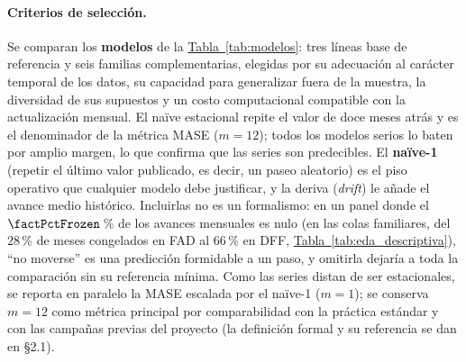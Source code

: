 \documentclass[12pt,letterpaper]{report}
\begin{document}
\paragraph{Criterios de selección.} Se comparan los \textbf{\factNModels{} modelos} de la
\hyperref[tab:modelos]{Tabla~\ref*{tab:modelos}}: tres líneas base de referencia y seis familias complementarias,
elegidas por su adecuación al carácter temporal de los datos, su capacidad para generalizar
fuera de la muestra, la diversidad de sus supuestos y un costo computacional compatible con la
actualización mensual. El naïve estacional repite el valor de doce meses atrás y es el
denominador de la métrica MASE ($m=12$); todos los modelos serios lo baten por amplio margen,
lo que confirma que las series son predecibles. El \textbf{naïve-1} (repetir el último valor
publicado, es decir, un paseo aleatorio) es el piso operativo que cualquier modelo debe
justificar, y la deriva (\textit{drift}) le añade el avance medio histórico. Incluirlas no es
un formalismo: en un panel donde el $\factPctFrozen$\,\% de los avances mensuales es nulo (en
las colas familiares, del $28$\,\% de meses congelados en FAD al $66$\,\% en DFF,
\hyperref[tab:eda_descriptiva]{Tabla~\ref*{tab:eda_descriptiva}}), ``no moverse'' es una predicción formidable a un paso, y
omitirla dejaría a toda la comparación sin su referencia mínima. Como las series distan de ser
estacionales, se reporta en paralelo la MASE escalada por el naïve-1 ($m=1$); se conserva
$m=12$ como métrica principal por comparabilidad con la práctica estándar y con las campañas
previas del proyecto (la definición formal y su referencia se dan en §2.1).
\end{document}

